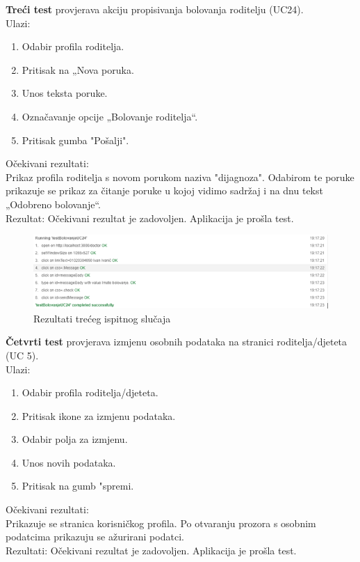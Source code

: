 		
		\noindent \textbf{Treći test} provjerava akciju propisivanja bolovanja roditelju (UC24).\\
		Ulazi:
		\begin{enumerate}
			\item Odabir profila roditelja.
			\item Pritisak na „Nova poruka.
			\item Unos teksta poruke.
			\item Označavanje opcije „Bolovanje roditelja“.
			\item Pritisak gumba "Pošalji".
		\end{enumerate}
		Očekivani rezultati:\\Prikaz profila roditelja s novom porukom naziva "dijagnoza". Odabirom te poruke prikazuje se prikaz za čitanje poruke u kojoj vidimo sadržaj i na dnu tekst „Odobreno bolovanje“.\\
		Rezultat: Očekivani rezultat je zadovoljen. Aplikacija je prošla test.
		
		\begin{figure}[H]
			\includegraphics[width=\textwidth]{slike/propisivanjeBolovanja.PNG} %
			\caption{Rezultati trećeg ispitnog slučaja}
			\label{fig:propisivanjeBolovanjaTest} %
		\end{figure}
		\eject 
		
		\noindent \textbf{Četvrti test} provjerava izmjenu osobnih podataka na stranici roditelja/djeteta (UC 5).\\
		Ulazi:
		\begin{enumerate}
			\item Odabir profila roditelja/djeteta.
			\item Pritisak ikone za izmjenu podataka.
			\item Odabir polja za izmjenu.
			\item Unos novih podataka.
			\item Pritisak na gumb "spremi.
		\end{enumerate}
		Očekivani rezultati:\\ Prikazuje se stranica korisničkog profila. Po otvaranju prozora s osobnim podatcima prikazuju se ažurirani podatci.\\
		Rezultati: Očekivani rezultat je zadovoljen. Aplikacija je prošla test.
		
